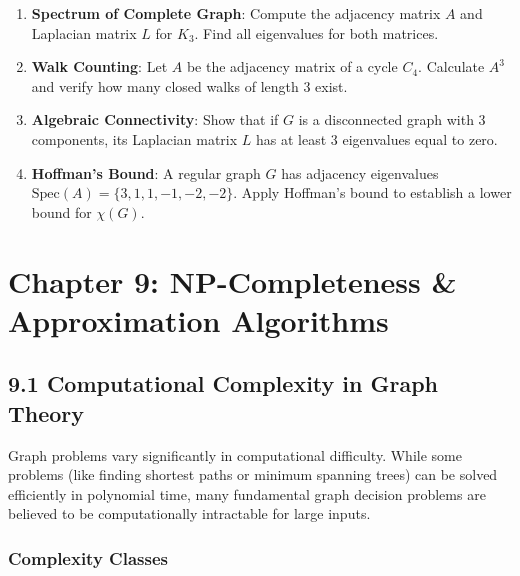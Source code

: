 \documentclass[
]{book}
\providecommand{\tightlist}{%
  \setlength{\itemsep}{0pt}\setlength{\parskip}{0pt}}
\theoremstyle{definition}
\theoremstyle{definition}
\theoremstyle{definition}
\theoremstyle{definition}
\theoremstyle{remark}
\begin{document}
\begin{enumerate}
\def\labelenumi{\arabic{enumi}.}
\tightlist
\item
  \textbf{Spectrum of Complete Graph}: Compute the adjacency matrix \(A\) and Laplacian matrix \(L\) for \(K_3\). Find all eigenvalues for both matrices.
\item
  \textbf{Walk Counting}: Let \(A\) be the adjacency matrix of a cycle \(C_4\). Calculate \(A^3\) and verify how many closed walks of length 3 exist.
\item
  \textbf{Algebraic Connectivity}: Show that if \(G\) is a disconnected graph with 3 components, its Laplacian matrix \(L\) has at least 3 eigenvalues equal to zero.
\item
  \textbf{Hoffman's Bound}: A regular graph \(G\) has adjacency eigenvalues \(\text{Spec}(A) = \{3, 1, 1, -1, -2, -2\}\). Apply Hoffman's bound to establish a lower bound for \(\chi(G)\).
\end{enumerate}

\chapter{Chapter 9: NP-Completeness \& Approximation Algorithms}\label{chapter-9-np-completeness-approximation-algorithms}

\section{9.1 Computational Complexity in Graph Theory}\label{computational-complexity-in-graph-theory}

Graph problems vary significantly in computational difficulty. While some problems (like finding shortest paths or minimum spanning trees) can be solved efficiently in polynomial time, many fundamental graph decision problems are believed to be computationally intractable for large inputs.

\subsection{Complexity Classes}\label{complexity-classes}
\end{document}
